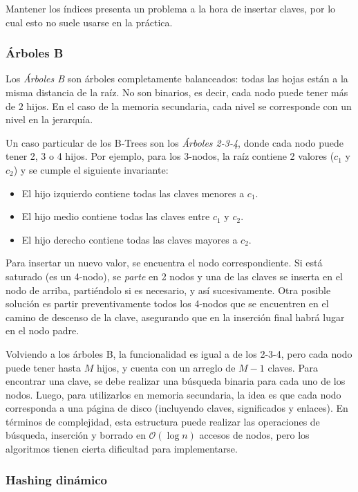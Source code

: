 \documentclass{article}
\newcommand{\BigO}[1]{{\mathcal{O}(#1)}}
\begin{document}
Mantener los índices presenta un problema a la hora de insertar claves, por lo cual esto no suele usarse en la práctica.

\subsubsection{Árboles B}

Los \textit{Árboles B} son árboles completamente balanceados: todas las hojas están a la misma distancia de la raíz. No son binarios, es decir, cada nodo puede tener más de $2$ hijos. En el caso de la memoria secundaria, cada nivel se corresponde con un nivel en la jerarquía.

Un caso particular de los B-Trees son los \textit{Árboles 2-3-4}, donde cada nodo puede tener 2, 3 o 4 hijos. Por ejemplo, para los 3-nodos, la raíz contiene 2 valores ($c_1$ y $c_2$) y se cumple el siguiente invariante:
\begin{itemize}
    \item El hijo izquierdo contiene todas las claves menores a $c_1$.
    \item El hijo medio contiene todas las claves entre $c_1$ y $c_2$.
    \item El hijo derecho contiene todas las claves mayores a $c_2$.
\end{itemize}

Para insertar un nuevo valor, se encuentra el nodo correspondiente. Si está saturado (es un 4-nodo), se \textit{parte} en 2 nodos y una de las claves se inserta en el nodo de arriba, partiéndolo si es necesario, y así sucesivamente. Otra posible solución es partir preventivamente todos los 4-nodos que se encuentren en el camino de descenso de la clave, asegurando que en la inserción final habrá lugar en el nodo padre.

Volviendo a los árboles B, la funcionalidad es igual a de los 2-3-4, pero cada nodo puede tener hasta $M$ hijos, y cuenta con un arreglo de $M-1$ claves. Para encontrar una clave, se debe realizar una búsqueda binaria para cada uno de los nodos. Luego, para utilizarlos en memoria secundaria, la idea es que cada nodo corresponda a una página de disco (incluyendo claves, significados y enlaces). En términos de complejidad, esta estructura puede realizar las operaciones de búsqueda, inserción y borrado en $\BigO{\log{n}}$ accesos de nodos, pero los algoritmos tienen cierta dificultad para implementarse.

\subsubsection{Hashing dinámico}
\end{document}
